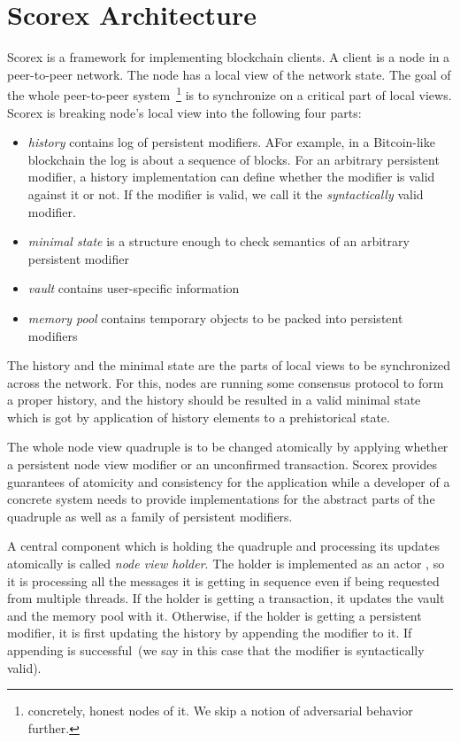
\section{Scorex Architecture}

Scorex is a framework for implementing blockchain clients. A client is a node in a peer-to-peer network. The node has a local view of the network state. The goal of the whole peer-to-peer system~\footnote{concretely, honest nodes of it. We skip a notion of adversarial behavior further.} is to synchronize on a critical part of local views. Scorex is breaking node's local view into the following four parts: 

\begin{itemize}
\item{\em history} contains log of persistent modifiers. AFor example, in a Bitcoin-like blockchain the log is about a sequence of blocks. For an arbitrary persistent modifier, a history implementation can define whether the modifier is valid against it or not.
If the modifier is valid, we call it the {\em syntactically} valid modifier.   
\item{\em minimal state} is a structure enough to check semantics of an arbitrary persistent modifier
\item{\em vault} contains user-specific information
\item{\em memory pool} contains temporary objects to be packed into persistent modifiers 
\end{itemize}

The history and the minimal state are the parts of local views to be synchronized across the network. For this, nodes are running some consensus protocol to form a proper history, and the history should be resulted in a valid minimal state which is got by application of history elements to a prehistorical state.

The whole node view quadruple is to be changed atomically by applying whether a persistent node view modifier or an unconfirmed transaction. Scorex provides guarantees of atomicity and consistency for the application while a developer of a concrete system needs to provide implementations for the abstract parts of the quadruple as well as a family of persistent modifiers.

A central component which is holding the quadruple {\em <history, minimal state, vault, memory pool>} and processing its updates atomically is called {\em node view holder}. The holder is implemented as an actor , so it is processing all the messages it is getting in sequence even if being requested from multiple threads. If the holder is getting a transaction, it updates the vault and the memory pool with it. Otherwise, if the holder is getting a persistent modifier, it is first updating the history by appending the modifier to it. If appending is successful~(we say in this case that the modifier is syntactically valid). 

